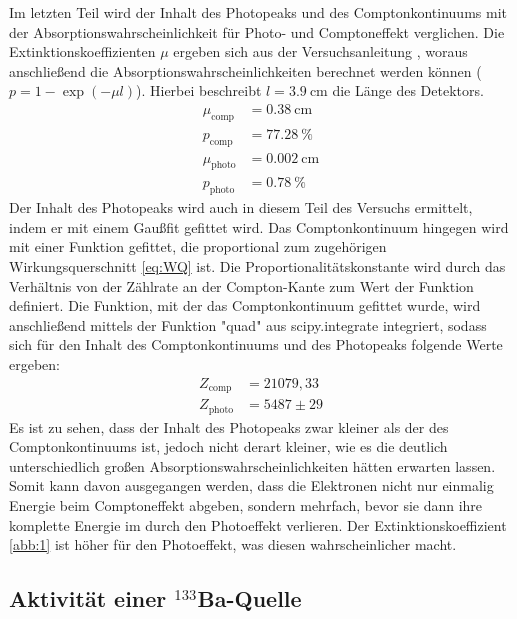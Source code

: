 \noindent Im letzten Teil wird der Inhalt des Photopeaks und des Comptonkontinuums mit der Absorptionswahrscheinlichkeit für Photo- und Comptoneffekt verglichen.
Die Extinktionskoeffizienten $\mu$ ergeben sich aus der Versuchsanleitung \cite{Q1}, woraus anschließend die Absorptionswahrscheinlichkeiten berechnet werden können ($p = 1-\exp(-\mu l)$). Hierbei beschreibt $l= \SI{3,9}{\centi \meter}$ die Länge des Detektors.
\begin{align*}
    \mu_{\text{comp}} &= \SI{0,38}{\centi \meter} \\
    p_{\text{comp}} &= \SI{77,28}{\percent}\\
    \mu_{\text{photo}} &= \SI{0,002}{\centi \meter} \\
    p_{\text{photo}} &= \SI{0,78}{\percent}
\end{align*}
Der Inhalt des Photopeaks wird auch in diesem Teil des Versuchs ermittelt, indem er mit einem Gaußfit gefittet wird. Das Comptonkontinuum hingegen wird mit einer Funktion gefittet, die proportional zum zugehörigen Wirkungsquerschnitt \ref{eq:WQ} ist. Die Proportionalitätskonstante wird durch das Verhältnis von der Zählrate an der Compton-Kante zum Wert der Funktion definiert.
Die Funktion, mit der das Comptonkontinuum gefittet wurde, wird anschließend mittels der Funktion "quad" aus scipy.integrate integriert, sodass sich für den Inhalt des Comptonkontinuums und des Photopeaks folgende Werte ergeben:
\begin{align*}
    Z_{\text{comp}}  &= 21079,33 \\
    Z_{\text{photo}} &= 5487 \pm 29
\end{align*}
Es ist zu sehen, dass der Inhalt des Photopeaks zwar kleiner als der des  Comptonkontinuums ist, jedoch nicht derart kleiner, wie es die deutlich unterschiedlich großen Absorptionswahrscheinlichkeiten hätten erwarten lassen.
Somit kann davon ausgegangen werden, dass die Elektronen nicht nur einmalig Energie beim Comptoneffekt abgeben, sondern mehrfach, bevor sie dann ihre komplette Energie im durch den Photoeffekt verlieren.
Der Extinktionskoeffizient \ref{abb:1} ist höher für den Photoeffekt, was diesen wahrscheinlicher macht.

\subsection{Aktivität einer $^{133}$Ba-Quelle}

